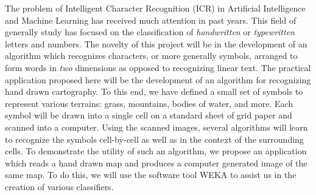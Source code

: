 
The problem of Intelligent Character Recognition (ICR) in Artificial
Intelligence and Machine Learning has received much attention in past years.
This field of generally study has focused on the classification of
\emph{handwritten}  or \emph{typewritten} letters and numbers.  The novelty of
this project will be in the development of an algorithm which recognizes
characters, or more generally symbols, arranged to form words in \emph{two}
dimensions as opposed to recognizing linear text. The practical application
proposed here will be the development of an algorithm for recognizing hand
drawn cartography. To this end, we have defined a small set of symbols to
represent various terrains: grass, mountains, bodies of water, and more. Each
symbol will be drawn into a single cell on a standard sheet of grid paper and
scanned into a computer. Using the scanned images, several algorithms will
learn to recognize the symbols cell-by-cell as well as in the context of the
surrounding cells. To demonstrate the utility of such an algorithm, we
propose an application which reads a hand drawn map and produces a computer
generated image of the same map. To do this, we will use the software tool
WEKA\cite{hall2009} to assist us in the creation of various classifiers.

